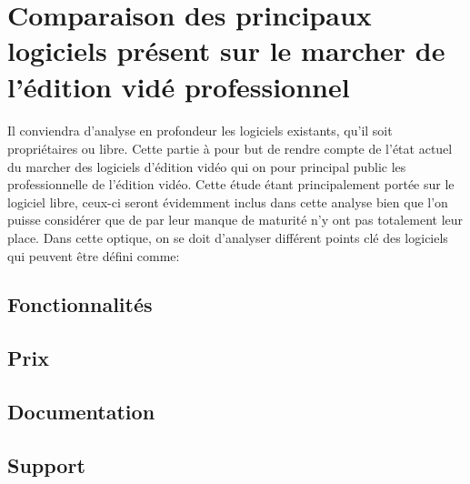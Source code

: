 \newpage
\section{Comparaison des principaux logiciels présent sur le marcher de
l'édition vidé professionnel}

\paragraph{}
  Il conviendra d'analyse en profondeur les logiciels existants, qu'il soit
  propriétaires ou libre. Cette partie à pour but de rendre compte de
  l'état actuel du marcher des logiciels d'édition vidéo qui on pour principal
  public les professionnelle de l'édition vidéo. Cette étude étant principalement portée
  sur le logiciel libre, ceux-ci seront évidemment inclus dans cette analyse
  bien que l'on puisse considérer que de par leur manque de maturité
  n'y ont pas totalement leur place. Dans cette optique, on se doit d'analyser
  différent points clé des logiciels qui peuvent être défini comme:

  \subsection{Fonctionnalités}
  \subsection{Prix}
  \subsection{Documentation}
  \subsection{Support}
